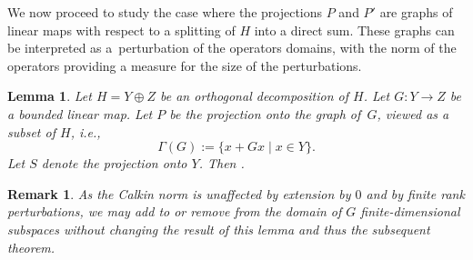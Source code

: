 \documentclass[pdftex]{sigma}
\numberwithin{equation}{section}
\newtheorem{Lemma}[Theorem]{Lemma}
\newtheorem{Remark}[Theorem]{Remark} }
\begin{document}
	We now proceed to study the case where the projections $P$ and $P'$ are graphs of linear maps with respect to a splitting of $H$ into a direct sum. These graphs can be interpreted as a~perturbation of the operators domains, with the norm of the operators providing a measure for the size of the perturbations.
	\begin{Lemma}
		\label{graphest}
		Let $H=Y\oplus Z$ be an orthogonal decomposition of $H$. Let $G\colon Y\rightarrow Z$ be a bounded linear map. Let $P$ be the projection onto the graph of~$G$, viewed as a subset of $H$, i.e.,
		\[\Gamma(G):=\{x+Gx\mid x\in Y\}.\]
		Let $S$ denote the projection onto $Y$. Then .
	\end{Lemma}
	\begin{Remark}
		As the Calkin norm is unaffected by extension by $0$ and by finite rank perturbations, we may add to or remove from the domain of $G$ finite-dimensional subspaces without changing the result of this lemma and thus the subsequent theorem.
	\end{Remark}	
\end{document}
